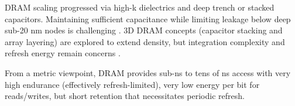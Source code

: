 DRAM scaling progressed via high-k dielectrics and deep trench or stacked capacitors. Maintaining sufficient capacitance while limiting leakage below deep sub-20 nm nodes is challenging \cite{choi2022}. 3D DRAM concepts (capacitor stacking and array layering) are explored to extend density, but integration complexity and refresh energy remain concerns \cite{kim2021_dram,iedm2023_dram}.

From a metric viewpoint, DRAM provides sub-\si{\nano\second} to tens of \si{\nano\second} access with very high endurance (effectively refresh-limited), very low energy per bit for reads/writes, but short retention that necessitates periodic refresh.
